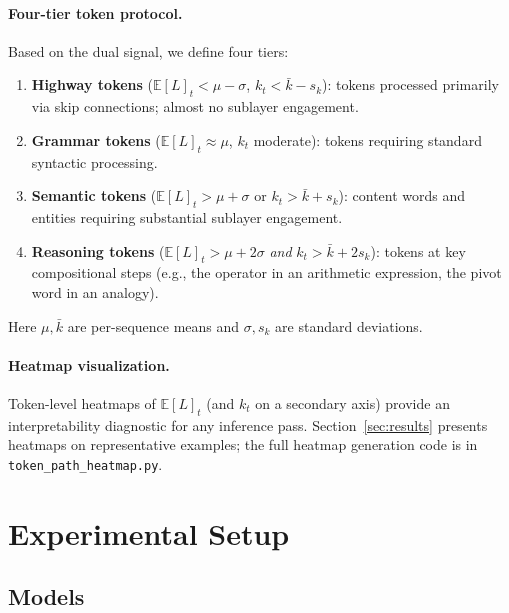 \documentclass{article}
\newcommand{\E}{\mathbb{E}}
\begin{document}
\paragraph{Four-tier token protocol.}
Based on the dual signal, we define four tiers:
\begin{enumerate}
  \item \textbf{Highway tokens} ($\E[L]_t < \mu - \sigma$, $k_t < \bar k - s_k$):
        tokens processed primarily via skip connections; almost no sublayer engagement.
  \item \textbf{Grammar tokens} ($\E[L]_t \approx \mu$, $k_t$ moderate):
        tokens requiring standard syntactic processing.
  \item \textbf{Semantic tokens} ($\E[L]_t > \mu + \sigma$ or $k_t > \bar k + s_k$):
        content words and entities requiring substantial sublayer engagement.
  \item \textbf{Reasoning tokens} ($\E[L]_t > \mu + 2\sigma$ \emph{and}
        $k_t > \bar k + 2s_k$): tokens at key compositional steps (e.g., the
        operator in an arithmetic expression, the pivot word in an analogy).
\end{enumerate}
Here $\mu, \bar k$ are per-sequence means and $\sigma, s_k$ are standard deviations.

\paragraph{Heatmap visualization.}
Token-level heatmaps of $\E[L]_t$ (and $k_t$ on a secondary axis) provide an
interpretability diagnostic for any inference pass.  Section~\ref{sec:results}
presents heatmaps on representative examples; the full heatmap generation code
is in \texttt{token\_path\_heatmap.py}.

\section{Experimental Setup}
\label{sec:exp}

\subsection{Models}
\label{sec:models}
\end{document}
